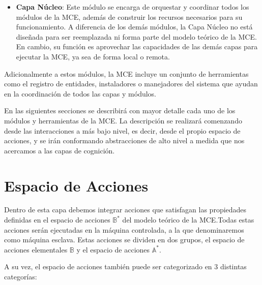 \begin{itemize}
    Como se detallará más adelante, la MCE puede dividirse en dos máquinas: una
    máquina maestra que ejecuta todas las capas de la MCE y una máquina esclava
    que realiza las acciones recibidas del maestro. Por esta razón, el Espacio
    de Acciones es compatible con diversos sistemas operativos (por ejemplo,
    Windows, Linux/Ubuntu o Raspbian), de modo que cualquiera de ellos puede
    actuar como esclavo de una MCE remota.

    \item \textbf{Capa Núcleo}: Este módulo se encarga de orquestar y coordinar
    todos los módulos de la MCE, además de construir los recursos necesarios
    para su funcionamiento. A diferencia de los demás módulos, la Capa Núcleo no
    está diseñada para ser reemplazada ni forma parte del modelo teórico de la
    MCE. En cambio, su función es aprovechar las capacidades de las demás capas
    para ejecutar la MCE, ya sea de forma local o remota.

\end{itemize}

Adicionalmente a estos módulos, la MCE incluye un conjunto de herramientas
como el registro de entidades, instaladores o manejadores del sistema que ayudan
en la coordinación de todos las capas y módulos. 

En las siguientes secciones se describirá con mayor detalle cada uno de los módulos
y herramientas de la MCE. La descripción se realizará comenzando desde las interacciones
a más bajo nivel, es decir, desde el propio espacio de acciones, y se irán conformando
abstracciones de alto nivel a medida que nos acercamos a las capas de cognición.

\section{Espacio de Acciones}

Dentro de esta capa debemos integrar acciones que satisfagan las propiedades
definidas en el espacio de acciones \(\mathbb{B}^*\) del modelo teórico de la
MCE.Todas estas acciones serán ejecutadas en la máquina controlada, a la que
denominaremos como máquina esclava. Estas acciones se dividen en dos grupos,
el espacio de acciones elementales \(\mathbb{B}\) y el espacio de acciones
\(\mathbb{A}^*\). 

A su vez, el espacio de acciones también puede ser categorizado en 3 distintas categorías:

